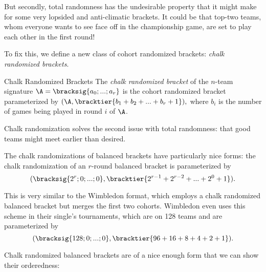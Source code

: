 {    But secondly, total randomness has the undesirable property that it might make for some very lopsided and anti-climatic brackets. It could be that top-two teams, whom everyone wants to see face off in the championship game, are set to play each other in the first round!

    To fix this, we define a new class of cohort randomized brackets: \textit{chalk randomized brackets}.

    \begin{definition}{Chalk Randomized Brackets}{}
        The \textit{chalk randomized bracket} of the $n$-team signature $\A = \bracksig{a_0; ...; a_r}$ is the cohort randomized bracket parameterized by $(\A, \bracktier{b_1 + b_2 + ... + b_r + 1}),$ where $b_i$ is the number of games being played in round $i$ of $\A$.
    \end{definition}

    Chalk randomization solves the second issue with total randomness: that good teams might meet earlier than desired.


    The chalk randomizations of balanced brackets have particularly nice forms: the chalk randomization of an $r$-round balanced bracket is parameterized by $$(\bracksig{2^r; 0; ...; 0}, \bracktier{2^{r-1} + 2^{r-2} + ... + 2^{0} + 1}).$$

    This is very similar to the Wimbledon format, which employs a chalk randomized balanced bracket but merges the first two cohorts. Wimbledon even uses this scheme in their single's tournaments, which are on 128 teams and are parameterized by $$(\bracksig{128; 0; ...; 0}, \bracktier{96 + 16 + 8 + 4 + 2 + 1}).$$

    Chalk randomized balanced brackets are of a nice enough form that we can show their orderedness:

}
